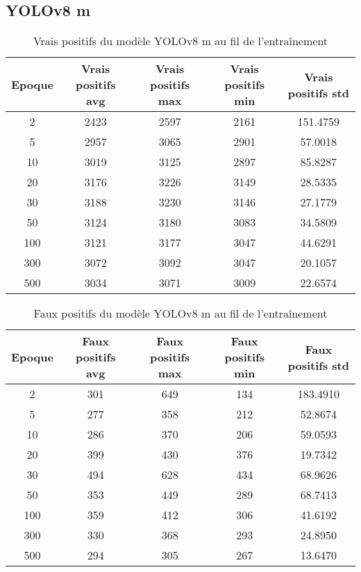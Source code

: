 
\clearpage
\subsection{YOLOv8 m}

\begin{table}[!ht]
    \caption{Vrais positifs du modèle YOLOv8 m au fil de l'entraînement}
    \label{tab:yolov8m_true_positive}
    \centering
    \begin{tabular}{ |c||c|c|c|c|  }
        \hline
        \rowcolor{gray!50}
        Epoque & Vrais positifs avg & Vrais positifs max & Vrais positifs min & Vrais positifs std\\
        \hline
        2 & 2423 & 2597 & 2161 & 151.4759\\
        5 & 2957 & 3065 & 2901 & 57.0018\\
        10 & 3019 & 3125 & 2897 & 85.8287\\
        20 & 3176 & 3226 & 3149 & 28.5335\\
        30 & 3188 & 3230 & 3146 & 27.1779\\
        50 & 3124 & 3180 & 3083 & 34.5809\\
        100 & 3121 & 3177 & 3047 & 44.6291\\
        300 & 3072 & 3092 & 3047 & 20.1057\\
        500 & 3034 & 3071 & 3009 & 22.6574\\
        \hline
    \end{tabular}
\end{table}

\begin{table}[!ht]
    \caption{Faux positifs du modèle YOLOv8 m au fil de l'entraînement}
    \label{tab:yolov8m_false_positive}
    \centering
    \begin{tabular}{ |c||c|c|c|c|  }
        \hline
        \rowcolor{gray!50}
        Epoque & Faux positifs avg & Faux positifs max & Faux positifs min & Faux positifs std\\
        \hline
        2 & 301 & 649 & 134 & 183.4910\\
        5 & 277 & 358 & 212 & 52.8674\\
        10 & 286 & 370 & 206 & 59.0593\\
        20 & 399 & 430 & 376 & 19.7342\\
        30 & 494 & 628 & 434 & 68.9626\\
        50 & 353 & 449 & 289 & 68.7413\\
        100 & 359 & 412 & 306 & 41.6192\\
        300 & 330 & 368 & 293 & 24.8950\\
        500 & 294 & 305 & 267 & 13.6470\\
        \hline
    \end{tabular}
\end{table}

